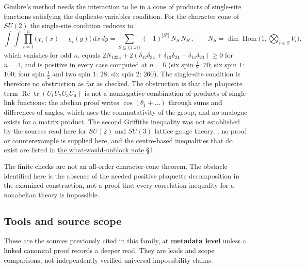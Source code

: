 \documentclass[11pt,a4paper]{article}
\begin{document}
Ginibre's method needs the interaction to lie in a cone of products of
single-site functions satisfying the duplicate-variables condition. For
the character cone of \(SU(2)\) the single-site condition reduces to
\[\int\!\!\int\prod_{i=1}^n\big(\chi_i(x)-\chi_i(y)\big)\,dx\,dy
=\sum_{S\subseteq\{1..n\}}(-1)^{|S^c|}\,N_S\,N_{S^c},\qquad
N_S=\dim\operatorname{Hom}\Big(1,\bigotimes_{i\in S}V_i\Big),\] which
vanishes for odd \(n\), equals
\(2N_{1234}+2(\delta_{12}\delta_{34}+\delta_{13}\delta_{24}+\delta_{14}\delta_{23})\ge0\)
for \(n=4\), and is positive in every case computed at \(n=6\) (six spin
\(\tfrac12\): \(70\); six spin \(1\): \(100\); four spin \(\tfrac12\)
and two spin \(1\): \(28\); six spin \(2\): \(260\)). The single-site
condition is therefore no obstruction as far as checked. The obstruction
is that the plaquette term
\(\operatorname{Re}\operatorname{tr}(U_1U_2U_3U_4)\) is not a
nonnegative combination of products of single-link functions: the
abelian proof writes \(\cos(\theta_1+\dots)\) through sums and
differences of angles, which uses the commutativity of the group, and no
analogue exists for a matrix product. The second Griffiths inequality
was not established by the sources read here for \(SU(2)\) and \(SU(3)\)
lattice gauge theory, ; no proof or counterexample is supplied here, and
the centre-based inequalities that do exist are listed in
\href{reasons-to-stop-as-research.md\#tools-and-source-scope}{the
what-would-unblock note} §1.

The finite checks are not an all-order character-cone theorem. The
obstacle identified here is the absence of the needed positive plaquette
decomposition in the examined construction, not a proof that every
correlation inequality for a nonabelian theory is impossible.

\hypertarget{tools-and-source-scope}{%
\subsection{Tools and source scope}\label{tools-and-source-scope}}

These are the sources previously cited in this family, at
\textbf{metadata level} unless a linked canonical proof records a deeper
read. They are leads and scope comparisons, not independently verified
universal impossibility claims.
\end{document}
